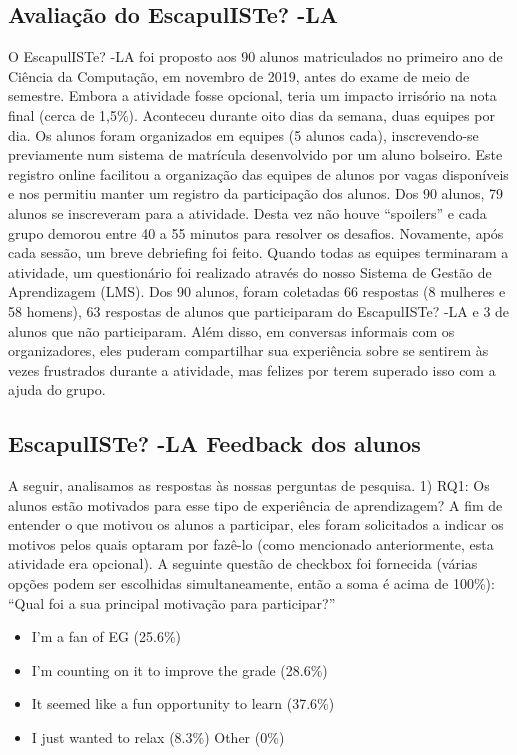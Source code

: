 \subsection{Avaliação do EscapulISTe? -LA}

O EscapulISTe? -LA foi proposto aos 90 alunos matriculados no primeiro ano de Ciência da Computação, em novembro de 2019, antes do exame de meio de semestre. Embora a atividade fosse opcional, teria um impacto irrisório na nota final (cerca de 1,5\%). Aconteceu durante oito dias da semana, duas equipes por dia. Os alunos foram organizados em equipes (5 alunos cada), inscrevendo-se previamente num sistema de matrícula desenvolvido por um aluno bolseiro. Este registro online facilitou a organização das equipes de alunos por vagas disponíveis e nos permitiu manter um registro da participação dos alunos. Dos 90 alunos, 79 alunos se inscreveram para a atividade. Desta vez não houve “spoilers” e cada grupo demorou entre 40 a 55 minutos para resolver os desafios. Novamente, após cada sessão, um breve debriefing foi feito. Quando todas as equipes terminaram a atividade, um questionário foi realizado através do nosso Sistema de Gestão de Aprendizagem (LMS). Dos 90 alunos, foram coletadas 66 respostas (8 mulheres e 58 homens), 63 respostas de alunos que participaram do EscapulISTe? -LA e 3 de alunos que não participaram. Além disso, em conversas informais com os organizadores, eles puderam compartilhar sua experiência sobre se sentirem às vezes frustrados durante a atividade, mas felizes por terem superado isso com a ajuda do grupo.

\subsection{EscapulISTe? -LA Feedback dos alunos}

A seguir, analisamos as respostas às nossas perguntas de pesquisa.
1) RQ1: Os alunos estão motivados para esse tipo de experiência de aprendizagem?
A fim de entender o que motivou os alunos a participar, eles foram solicitados a indicar os motivos pelos quais optaram por fazê-lo (como mencionado anteriormente, esta atividade era opcional). A seguinte questão de checkbox foi fornecida (várias opções podem ser escolhidas simultaneamente, então a soma é acima de 100\%): “Qual foi a sua principal motivação para participar?”

\begin{itemize}
    \item I'm a fan of EG (25.6\%)
    \item I’m counting on it to improve the grade (28.6\%)
    \item It seemed like a fun opportunity to learn (37.6\%)
    \item I just wanted to relax (8.3\%)
Other (0\%)
    
\end{itemize}

